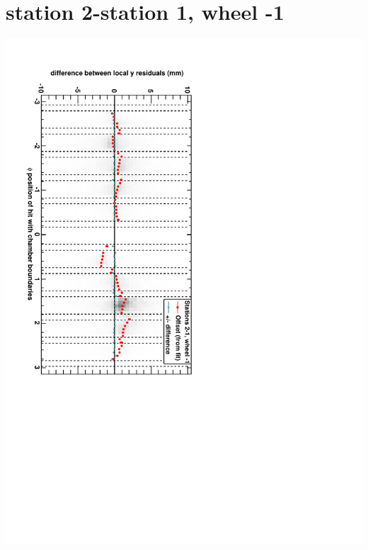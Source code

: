 \documentclass[compress]{beamer}
\begin{document}
\section*{station 2-station 1, wheel -1}
\begin{frame} \vfill \mbox{\hspace{-1 cm}\includegraphics[height=1.2\linewidth, angle=90]{DTzdiff12VsPhi_whB_slope.pdf}} \end{frame}
\end{document}
